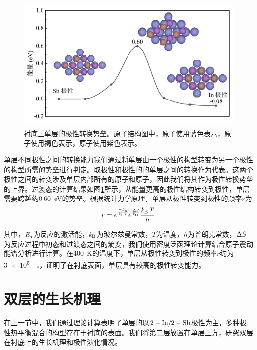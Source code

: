 \begin{figure}[htb]
    \includegraphics{pic/IS_DFT_1InSb_flipBarrier.png}
    \caption{衬底上单层的极性转换势垒。原子结构图中，原子使用蓝色表示，原子使用褐色表示，原子使用紫色表示。}
    \label{fig:IS_DFT_1LInSb_InPtoSbPNeb}
\end{figure}

单层不同极性之间的转换能力我们通过将单层由一个极性的构型转变为另一个极性的构型所需的势垒进行判定。取极性和极性的的单层之间的转换作为代表。这两个极性之间的转变涉及单层内部所有的原子和原子，因此我们将其作为极性转换势垒的上界。过渡态的计算结果如图\ref{fig:IS_DFT_1LInSb_InPtoSbPNeb}所示，从能量更高的极性结构转变到极性，单层需要跨越约\SI{0.60}{\electronvolt}的势垒。根据统计力学原理，单层从极性转变到极性的频率$r$为\chinesecolon
\[
    r=e^{\frac{-\it E_{\rm a}^{\rm } \it}{\it k_{\rm B} \it T}}e^{\frac{\rm{\Delta} \it S}{\it k_{\rm B} \it}} \frac{\it k_{\rm B} \it T}{h}
\]

其中，$\it E_{\rm a}^{\rm } \it$为反应的激活能，$\it k_{\rm B} \it$为玻尔兹曼常数，$T$为温度，$h$为普朗克常数，$\rm{\Delta} \it S$为反应过程中初态和过渡态之间的熵变，我们使用密度泛函理论计算结合原子震动能谱分析进行计算。在\SI{400}{\kelvin}的温度下，单层从极性转变到极性的频率$r$约为\SI{3e5}{\per\second}，证明了在衬底表面，单层具有较高的极性转变能力。

\section{双层的生长机理}
在上一节中，我们通过理论计算表明了单层的以$\rm 2-In/2-Sb$极性为主，多种极性热平衡混合的构型存在于衬底的表面。我们将第二层放置在单层上方，研究双层在衬底上的生长机理和极性演化情况。

